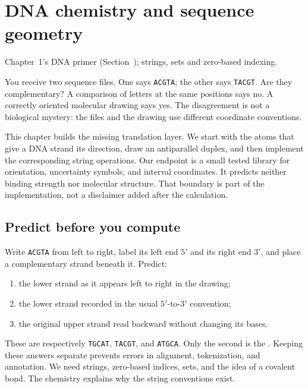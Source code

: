 \chapter{DNA chemistry and sequence geometry}
\label{ch:chemistry}
{Chapter~1's DNA primer (Section~); strings, sets and zero-based indexing.}

You receive two sequence files. One says \texttt{ACGTA}; the other says
\texttt{TACGT}. Are they complementary? A comparison of letters at the same
positions says no. A correctly oriented molecular drawing says yes. The
disagreement is not a biological mystery: the files and the drawing use
different coordinate conventions.

This chapter builds the missing translation layer. We start with the atoms
that give a DNA strand its direction, draw an antiparallel duplex, and then
implement the corresponding string operations. Our endpoint is a small
tested library for orientation, uncertainty symbols, and interval coordinates.
It predicts neither binding strength nor molecular structure. That boundary
is part of the implementation, not a disclaimer added after the calculation.

\section{Predict before you compute}

Write \texttt{ACGTA} from left to right, label its left end $5'$ and its
right end $3'$, and place a complementary strand beneath it. Predict:
\begin{enumerate}
\item the lower strand as it appears left to right in the drawing;
\item the lower strand recorded in the usual $5'$-to-$3'$ convention;
\item the original upper strand read backward without changing its bases.
\end{enumerate}
These are respectively \texttt{TGCAT}, \texttt{TACGT}, and \texttt{ATGCA}.
Only the second is the . Keeping these answers
separate prevents errors in alignment, tokenization, and annotation.
We need strings, zero-based indices, sets, and the idea of a covalent bond.
The chemistry explains why the string conventions exist.

